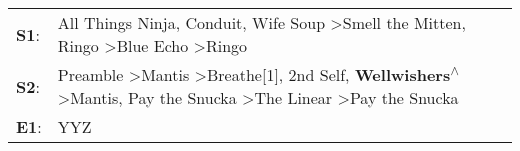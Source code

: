 \begin{supertabular}{p{0.03\textwidth}p{0.92\textwidth}}
 \textbf{S1}:  &                                                                                                                         All Things Ninja\textsuperscript{}, \enspace Conduit\textsuperscript{}, \enspace Wife Soup\textsuperscript{} \textgreater \enspace Smell the Mitten\textsuperscript{}, \enspace Ringo\textsuperscript{} \textgreater \enspace Blue Echo\textsuperscript{} \textgreater \enspace Ringo\textsuperscript{}  \enspace  \\
 \textbf{S2}:  &  Preamble\textsuperscript{} \textgreater \enspace Mantis\textsuperscript{} \textgreater \enspace Breathe[1]\textsuperscript{}, \enspace 2nd Self\textsuperscript{}, \enspace \textbf{Wellwishers\textsuperscript{$\wedge$}} \textgreater \enspace Mantis\textsuperscript{}, \enspace Pay the Snucka\textsuperscript{} \textgreater \enspace The Linear\textsuperscript{} \textgreater \enspace Pay the Snucka\textsuperscript{}  \enspace  \\
 \textbf{E1}:  &                                                                                                                                                                                                                                                                                                                                                                                                           YYZ\textsuperscript{}  \enspace  \\
\end{supertabular}

